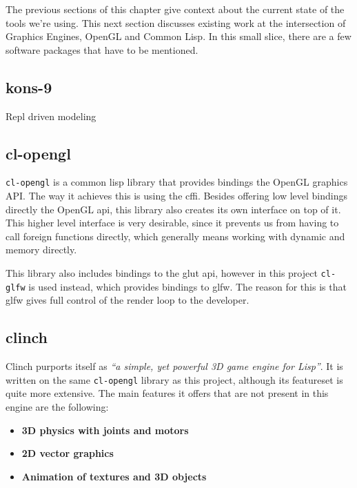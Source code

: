 The previous sections of this chapter give context about the current state of the tools we're using.
This next section discusses existing work at the intersection of Graphics Engines, OpenGL and Common Lisp.
In this small slice,
there are a few software packages that have to be mentioned.


\subsection{kons-9}

Repl driven modeling

\subsection{cl-opengl}

\texttt{cl-opengl} is a common lisp library that provides bindings the OpenGL graphics API.
The way it achieves this is using the \ac{cffi}.
Besides offering low level bindings directly the OpenGL \ac{api},
this library also creates its own interface on top of it.
This higher level interface is very desirable,
since it prevents us from having to call foreign functions directly,
which generally means working with dynamic and memory directly\cite{cffi}.

This library also includes bindings to the \ac{glut} \ac{api},
however in this project \texttt{cl-glfw} is used instead,
which provides bindings to \ac{glfw}.
The reason for this is that \ac{glfw} gives full control of the render loop to the developer.

\subsection{clinch}

Clinch purports itself as \textit{``a simple, yet powerful 3D game engine for Lisp''}. It is written on the same \texttt{cl-opengl} library as this project, although its feature\-set is quite more extensive. The main features it offers that are not present in this engine are the following\cite{clinch}:

\begin{itemize}
\item \textbf{3D physics with joints and motors}
\item \textbf{2D vector graphics}
\item \textbf{Animation of textures and 3D objects}
\end{itemize}

